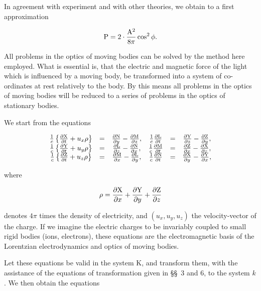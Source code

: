 \documentclass{article}
\newcommand{\dd}[2]{\frac{\partial #1}{\partial #2}}
\newcommand{\ic}{\frac{1}{c}}
\begin{document}
\noindent
In agreement with experiment and with other theories, we obtain to a
first approximation

\[
{\rm P}=2\cdot\frac{{\rm A}^2}{8\pi}\cos^2\phi.
\]

All problems in the optics of moving bodies can be solved by the
method here employed.  What is essential is, that the electric and
magnetic force of the light which is influenced by a moving body, be
transformed into a system of co-ordinates at rest relatively to the
body.  By this means all problems in the optics of moving bodies will
be reduced to a series of problems in the optics of stationary bodies.


We start from the equations 

\renewcommand{\arraystretch}{1.5}
{\Large
\[
\begin{array}{cccccc}
\ic\left\{\dd{\rm X}{t}+u_x\rho\right\} & = & \dd{\rm N}{y} - \dd{\rm M}{z},
 & \ic\dd{\rm L}{t} & = & \dd{\rm Y}{z} - \dd{\rm Z}{y}, \\
\ic\left\{\dd{\rm Y}{t}+u_y\rho\right\} & = & \dd{\rm L}{z} - \dd{\rm N}{x},
 & \ic\dd{\rm M}{t} & = & \dd{\rm Z}{x} - \dd{\rm X}{z}, \\
\ic\left\{\dd{\rm Z}{t}+u_z\rho\right\} & = & \dd{\rm M}{x} - \dd{\rm L}{y},
 & \ic\dd{\rm N}{t} & = & \dd{\rm X}{y} - \dd{\rm Y}{x}, \\
\end{array}
\]
}
\renewcommand{\arraystretch}{1}

\noindent
where

\[
\rho=\dd{\rm X}{x}+\dd{\rm Y}{y}+\dd{\rm Z}{z}
\]

\noindent
denotes $4\pi$ times the density of electricity, and $(u_x,u_y,u_z)$ the
velocity-vector of the charge.  If we imagine the electric charges to
be invariably coupled to small rigid bodies (ions, electrons), these
equations are the electromagnetic basis of the Lorentzian
electrodynamics and optics of moving bodies.

Let these equations be valid in the system K, and transform them, with
the assistance of the equations of transformation given in \S\S\ 3 and 6,
to the system $k$.  We then obtain the equations
\end{document}
